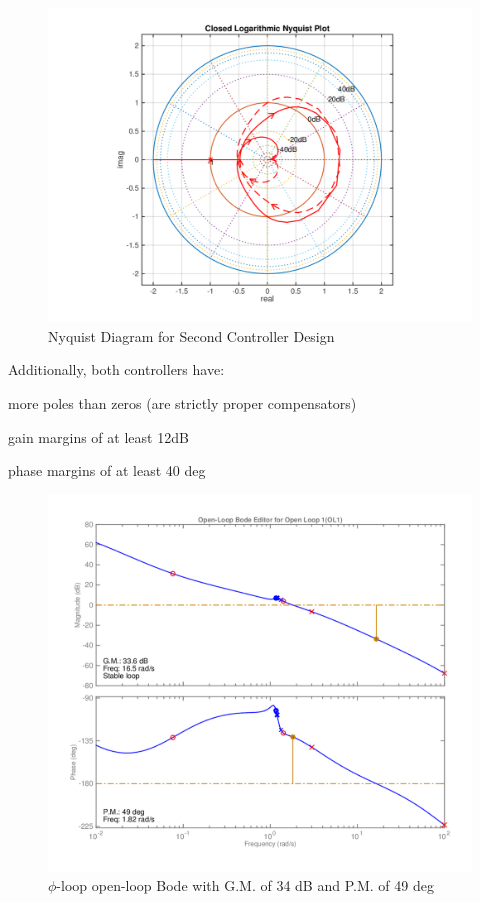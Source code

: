 \documentclass[12pt]{article}
\begin{document}
\begin{figure}[h!]
\begin{center}
\includegraphics[height=.425\textheight]{figures/r_nyquist2}
\caption{Nyquist Diagram for Second Controller Design}
\end{center}
\end{figure}

\noindent Additionally, both controllers have:

more poles than zeros (are strictly proper compensators)

gain margins of at least 12dB

phase margins of at least 40 deg

\clearpage
\begin{figure}[h!]
\begin{center}
\includegraphics[height=.435\textheight]{figures/phi_delta_a_open_loop}
\caption{$\phi$-loop open-loop Bode with G.M. of 34 dB and P.M. of 49 deg}
\end{center}
\end{figure}
\end{document}
